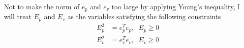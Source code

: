 \documentclass{article}
\begin{document}
Not to make the norm of $e_p$ and $e_v$ too large by applying Young's inequality, I will treat $E_p$ and $E_v$ as the variables satisfying the following constraints
\begin{align}
E_p^2 &= e_p^Te_p,\;\;E_p \geq 0 \nonumber \\
E_v^2 &= e_v^Te_v,\;\;E_v \geq 0 \nonumber
\end{align}
\end{document}
